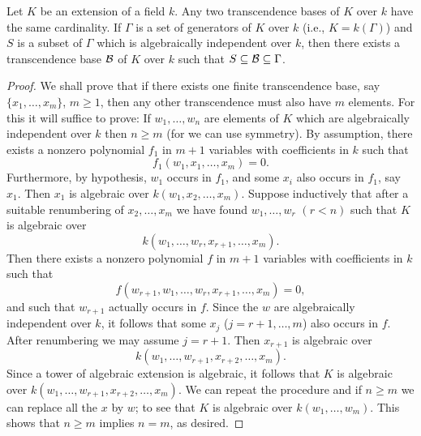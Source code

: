 \begin{theorem}
  Let \(K\) be an extension of a field \(k\). Any two transcendence bases of
  \(K\) over \(k\) have the same cardinality. If \(\Gamma\) is a set of
  generators of \(K\) over \(k\) (i.e., \(K=k(\Gamma)\)) and \(S\) is a
  subset of \(\Gamma\) which is algebraically independent over \(k\), then
  there exists a transcendence base \(\mathcal{B}\) of \(K\) over \(k\) such that
  \(S\subseteq\mathcal{B}\subseteq\Gamma\).
\end{theorem}
\begin{proof}
  We shall prove that if there exists one finite transcendence base, say
  \(\{x_1,\dotsc,x_m\}\), \(m\geq 1\), then any other transcendence must
  also have \(m\) elements. For this it will suffice to prove: If
  \(w_1,\dotsc,w_n\) are elements of \(K\) which are algebraically
  independent over \(k\) then \(n\geq m\) (for we can use symmetry). By
  assumption, there exists a nonzero polynomial \(f_1\) in \(m+1\)
  variables with coefficients in \(k\) such that
  \[
    f_1(w_1,x_1,\dotsc,x_m)=0.
  \]
  Furthermore, by hypothesis,  \(w_1\) occurs in \(f_1\), and some \(x_i\)
  also occurs in \(f_1\), say \(x_1\). Then \(x_1\) is algebraic over
  \(k(w_1,x_2,\dotsc,x_m)\). Suppose inductively that after a suitable
  renumbering of \(x_2,\dotsc,x_m\) we have found \(w_1,\dotsc,w_r\)
  \((r<n)\) such that \(K\) is algebraic over
  \[
    k(w_1,\dotsc,w_r,x_{r+1},\dotsc,x_m).
  \]
  Then there exists a nonzero polynomial \(f\) in \(m+1\) variables with
  coefficients in \(k\) such that
  \[
    f(w_{r+1},w_1,\dotsc,w_r,x_{r+1},\dotsc,x_m)=0,
  \]
  and such that \(w_{r+1}\) actually occurs in \(f\). Since the \(w\) are
  algebraically independent over \(k\), it follows that some \(x_j\)
  (\(j=r+1,\dotsc,m\)) also occurs in \(f\). After renumbering we may
  assume \(j=r+1\). Then \(x_{r+1}\) is algebraic over
  \[
    k(w_1,\dotsc,w_{r+1},x_{r+2},\dotsc,x_m).
  \]
  Since a tower of algebraic extension is algebraic, it follows that \(K\)
  is algebraic over \(k(w_1,\dotsc,w_{r+1},x_{r+2},\dotsc,x_m)\). We can
  repeat the procedure and if \(n\geq m\) we can replace all the \(x\) by
  \(w\); to see that \(K\) is algebraic over \(k(w_1,\dotsc,w_m)\). This
  shows that \(n\geq m\) implies \(n=m\), as desired.
\end{proof}

